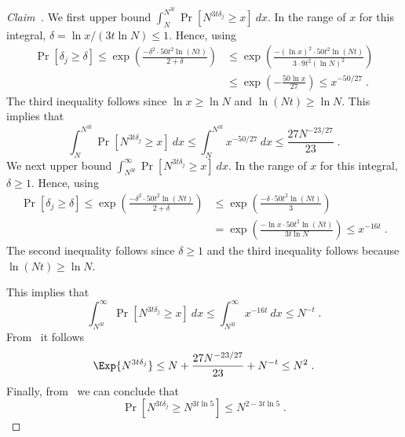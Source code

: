 \begin{proof}[Claim~]
    We first upper bound $\int_N^{N^{3t}} \Pr[N^{3t\delta_j}\geq x]~dx$. In the range of $x$ for this integral, $\delta=\ln x/(3t\ln N) \leq 1$. Hence, using 
    \begin{align*}
        \Pr[\delta_j\geq \delta]\leq \exp\left(\frac{-\delta^2\cdot 50t^2\ln (Nt)}{2+\delta}\right)
        &\leq \exp\left(\frac{-(\ln x)^2\cdot 50t^2\ln (Nt)}{3\cdot 9t^2(\ln N)^2}\right)\\
        &\leq \exp(-\frac{50\ln x}{27})\leq x^{-50/27}\;.
    \end{align*}
    The third inequality follows since $\ln x\geq \ln N$ and $\ln (Nt)\geq \ln N$.
%
This implies that 
 \begin{equation}\label{eq:intf}
        \int_N^{N^{3t}} \Pr[N^{3t\delta_j}\geq x]~dx\leq  \int_N^{N^{3t}} x^{-50/27}~dx \leq \frac{27N^{-23/27}}{23}\;.
    \end{equation}
    We next upper bound $\int_{N^{3t}}^\infty \Pr[N^{3t\delta_j}\geq x]~dx$. In the range of $x$ for this integral, $\delta \geq 1$. Hence, using 
    \begin{align*}
        \Pr[\delta_j\geq \delta]\leq \exp\left(\frac{-\delta^2 \cdot 50t^2\ln (Nt)}{2+\delta}\right)&\leq \exp\left(\frac{-\delta \cdot 50t^2\ln (Nt)}{3}\right)\\ & =\exp\left(\frac{-\ln x \cdot 50t^2\ln (Nt)}{3t\ln N}\right)\leq x^{-16t}\;.
    \end{align*}
    The second inequality follows since $\delta\geq 1$ and the third inequality follows because $\ln (Nt)\geq \ln N$.

   This implies that
    \begin{equation}\label{eq:ints}
        \int_{N^{3t}}^\infty \Pr[N^{3t\delta_j}\geq x]~dx\leq  \int_{N^{3t}}^\infty x^{-16t}~dx \leq  N^{-t}\;.
    \end{equation}
    From~ it follows 
    \[\Exp{N^{3t\delta_j}}\leq N+\frac{27N^{-23/27}}{23}+N^{-t}\leq N^2\;.\]
Finally, from~ we can conclude that
\[\Pr[N^{3t\delta_j}\geq N^{3t\ln 5}] \leq N^{2-3t\ln 5}\;.\]
\end{proof}


